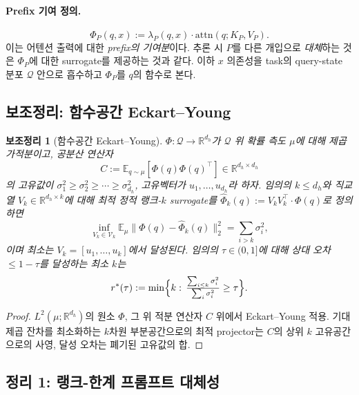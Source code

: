 \documentclass[11pt]{article}
\newtheorem{lemma}{보조정리}
\theoremstyle{definition}
\newcommand{\R}{\mathbb{R}}
\newcommand{\E}{\mathbb{E}}
\newcommand{\Phip}{\Phi_P}
\newcommand{\dh}{d_h}
\newcommand{\attn}{\mathrm{attn}}
\begin{document}
\paragraph{Prefix 기여 정의.}
\begin{equation}
\Phip(q,x) := \lambda_P(q,x)\cdot \attn(q; K_P, V_P).
\end{equation}
이는 어텐션 출력에 대한 \emph{prefix의 기여분}이다. 추론 시 $P$를 다른 개입으로 \emph{대체}하는 것은 $\Phip$에 대한 surrogate를 제공하는 것과 같다. 이하 $x$ 의존성을 task의 query-state 분포 $\mathcal{Q}$ 안으로 흡수하고 $\Phip$를 $q$의 함수로 본다.

\subsection{보조정리: 함수공간 Eckart--Young}
\label{sec:lemma-eckart}

\begin{lemma}[함수공간 Eckart--Young]
\label{lem:eckart}
$\Phi: \mathcal{Q} \to \R^{\dh}$가 $\mathcal{Q}$ 위 확률 측도 $\mu$에 대해 제곱 가적분이고, 공분산 연산자
\[
C := \E_{q\sim\mu}[\Phi(q)\Phi(q)^\top] \in \R^{\dh\times \dh}
\]
의 고유값이 $\sigma_1^2 \ge \sigma_2^2 \ge \cdots \ge \sigma_{\dh}^2$, 고유벡터가 $u_1, \dots, u_{\dh}$라 하자. 임의의 $k\le\dh$와 직교 열 $V_k \in \R^{\dh\times k}$에 대해 최적 정적 랭크-$k$ surrogate를 $\widehat{\Phi}_k(q) := V_k V_k^\top \cdot \Phi(q)$로 정의하면
\begin{equation}
\inf_{V_k\in \mathcal{V}_k} \E_\mu \bigl\| \Phi(q) - \widehat{\Phi}_k(q)\bigr\|_2^2 = \sum_{i>k}\sigma_i^2,
\end{equation}
이며 최소는 $V_k = [u_1, \dots, u_k]$에서 달성된다. 임의의 $\tau \in (0,1]$에 대해 상대 오차 $\le 1-\tau$를 달성하는 최소 $k$는
\begin{equation}
r^*(\tau) := \min\Bigl\{k:\, \tfrac{\sum_{i\le k}\sigma_i^2}{\sum_{i}\sigma_i^2}\ge \tau\Bigr\}.
\end{equation}
\end{lemma}

\begin{proof}
$L^2(\mu;\R^{\dh})$의 원소 $\Phi$, 그 위 적분 연산자 $C$ 위에서 Eckart--Young 적용. 기대 제곱 잔차를 최소화하는 $k$차원 부분공간으로의 최적 projector는 $C$의 상위 $k$ 고유공간으로의 사영, 달성 오차는 폐기된 고유값의 합.
\end{proof}

\subsection{정리 1: 랭크-한계 프롬프트 대체성}
\label{sec:thm1}
\end{document}
